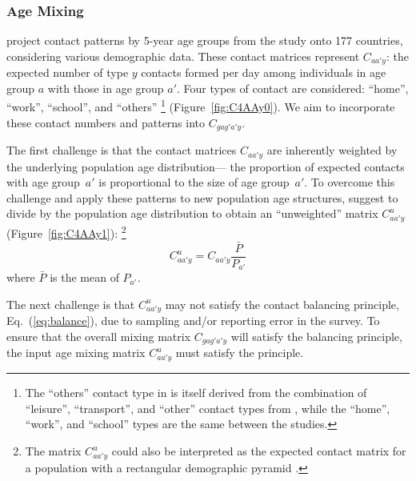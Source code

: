 \subsubsection{Age Mixing}\label{meth.prop.mix.age}
\citet{Prem2021} project contact patterns by 5-year age groups
from the \polymod study \cite{Mossong2008} onto 177 countries,
considering various demographic data.
These contact matrices represent $C_{aa'y}$:
the expected number of type $y$ contacts formed per day among
individuals in age group $a$ with those in age group $a'$.
Four types of contact are considered: ``home'', ``work'', ``school'', and ``others''%
\footnote{The ``others'' contact type in \cite{Prem2021} is itself derived from
  the combination of ``leisure'', ``transport'', and ``other'' contact types from \cite{Mossong2008},
  while the ``home'', ``work'', and ``school'' types are the same between the studies.}
(Figure~\ref{fig:C4AAy0}).
We aim to incorporate these contact numbers and patterns into $C_{gag'a'y}$.
\par
The first challenge is that the contact matrices $C_{aa'y}$ are
inherently weighted by the underlying population age distribution---%
the proportion of expected contacts with age group~$a'$ is proportional to the size of age group~$a'$.
To overcome this challenge and apply these patterns to new population age structures,
\citet{Arregui2018} suggest to divide by the population age distribution
to obtain an ``unweighted'' matrix $C^u_{aa'y}$ (Figure~\ref{fig:C4AAy1}):%
\footnote{The matrix $C^u_{aa'y}$ could also be interpreted as
  the expected contact matrix for a population with a rectangular demographic pyramid \cite{Arregui2018}.}
\begin{equation}\label{eq:C^u}
  C^u_{aa'y} = C_{aa'y} \frac{\bar{P}}{P_{a'}}
\end{equation}
where $\bar{P}$ is the mean of $P_{a'}$.
\par
The next challenge is that $C^u_{aa'y}$ may not satisfy
the contact balancing principle, Eq.~(\ref{eq:balance}),
due to sampling and/or reporting error in the \polymod survey.
To ensure that the overall mixing matrix $C_{gag'a'y}$ will satisfy the balancing principle,
the input age mixing matrix $C^u_{aa'y}$ must satisfy the principle.

